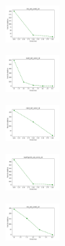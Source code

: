 \begin{figure}[H]
    \centering
    \begin{subfigure}
        \centering
        \includegraphics[width=0.234\textwidth]{img/copkm2/iris_set_const_10_949004259_cost.png}
    \end{subfigure}
    \hfill
    \begin{subfigure}
        \centering
        \includegraphics[width=0.234\textwidth]{img/copkm2/ecoli_set_const_10_949004259_cost.png}
    \end{subfigure}
    \hfill
    \begin{subfigure}
        \centering
        \includegraphics[width=0.234\textwidth]{img/copkm2/rand_set_const_10_949004259_cost.png}
    \end{subfigure}
    \hfill
    \begin{subfigure}
        \centering
        \includegraphics[width=0.234\textwidth]{img/copkm2/newthyroid_set_const_10_949004259_cost.png}
    \end{subfigure}
    \hfill
    \begin{subfigure}
        \centering
        \includegraphics[width=0.234\textwidth]{img/copkm2/iris_set_const_10_589741062_cost.png}
    \end{subfigure}
    \hfill

\end{figure}
